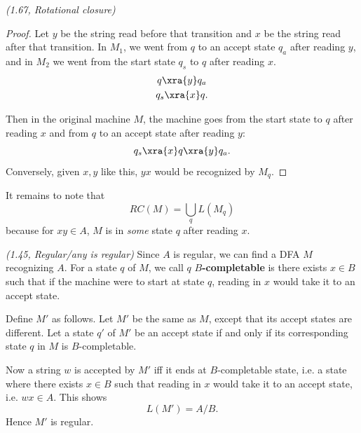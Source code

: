 \begin{problem}{\it(1.67, Rotational closure)}
\begin{enumerate}
\begin{proof}
Let $y$ be the string read before that transition and $x$ be the string read after that transition. In $M_1$, we went from $q$ to an accept state $q_a$ after reading $y$, and in $M_2$ we went from the start state $q_s$ to $q$ after reading $x$.
\begin{gather*}
q\xra{y} q_a\\
q_s\xra{x} q.
\end{gather*}

Then in the original machine $M$, the machine goes from the start state to $q$ after reading $x$ and from $q$ to an accept state after reading $y$:
\[
q_s\xra{x}q\xra{y}q_a.
\]
Conversely, given $x,y$ like this, $yx$ would be recognized by $M_q$.
\end{proof}

It remains to note that
\[
RC(M)=\bigcup_q L(M_q)
\]
because for $xy\in A$, $M$ is in {\it some} state $q$ after reading $x$.
\end{enumerate}
\end{problem}

\pagebreak
\begin{problem}{\it(1.45, Regular/any is regular)}
Since $A$ is regular, we can find a DFA $M$ recognizing $A$. For a state $q$ of $M$, we call $q$ \textbf{$B$-completable} is there exists $x\in B$ such that if the machine were to start at state $q$, reading in $x$ would take it to an accept state.

Define $M'$ as follows. Let $M'$ be the same as $M$, except that its accept states are different. Let a state $q'$ of $M'$ be an accept state if and only if its corresponding state $q$ in $M$ is $B$-completable.

Now a string $w$ is accepted by $M'$ iff it ends at $B$-completable state, i.e. a state where there exists $x\in B$ such that reading in $x$ would take it to an accept state, i.e. $wx\in A$. This shows
\[
L(M')=A/B.
\]
Hence $M'$ is regular.
\end{problem}

\pagebreak

